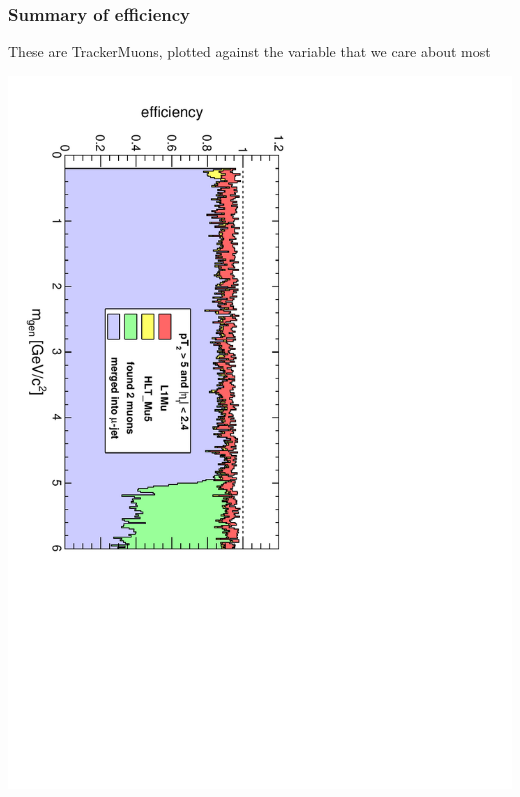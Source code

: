 \documentclass[compress]{beamer}
\begin{document}
\begin{frame}
\frametitle{Summary of efficiency}
These are TrackerMuons, plotted against the variable that we care about most

\includegraphics[height=\linewidth, angle=90]{mass.pdf}
\end{frame}
\end{document}
